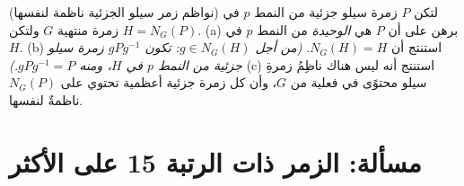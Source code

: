 \begin{exercise}[$\star\star$]\label{exo:b3:groups:12}
(نواظم زمر سيلو الجزئية ناظمة لنفسها) لتكن $P$ زمرة سيلو جزئية من
النمط $p$ في زمرة منتهية $G$ ولتكن $H =
N_G(P)$.
(a) برهن على أن $P$ هي  \emph{الوحيدة} من النمط
$p$ في $H$.
(b) استنتج أن $N_G(H) = H$. \emph{(من أجل $g \in N_G(H)$: تكون
$gPg^{-1}$ زمرة سيلو جزئية من النمط $p$ في $H$، ومنه
$gPg^{-1} = P$.)}
(c) استنتج أنه ليس هناك ناظِمُ زمرةِ سيلو محتوًى في  فعلية من $G$، وأن كل زمرة جزئية أعظمية تحتوي على $N_G(P)$
ناظمةٌ لنفسها.
\end{exercise}

\section{مسألة: الزمر ذات الرتبة 15 على الأكثر}

